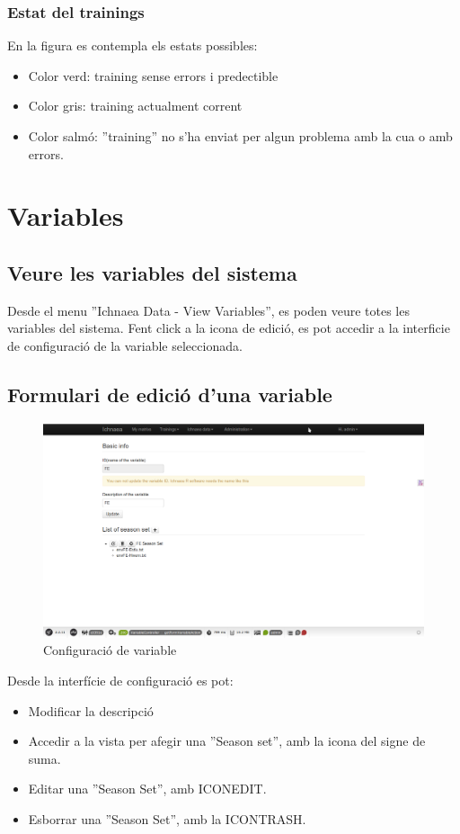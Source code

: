 \subsubsection*{Estat del trainings}
En la figura es contempla els estats possibles:
\begin{itemize}
\item Color verd: training sense errors i predectible
\item Color gris: training actualment corrent
\item Color salm\'{o}: ''training'' no s'ha enviat per algun problema amb la cua o amb errors.
\end{itemize}

\section{Variables}
\subsection{Veure les variables del sistema}
Desde el menu ''Ichnaea  Data - View Variables'', es poden veure totes les variables del sistema. Fent click a la icona de edici\'{o}, es pot accedir a la interficie de configuraci\'{o} de la variable seleccionada.

\subsection{Formulari de edici\'{o} d'una variable}
\begin{figure}[h!]
  \centering
  \includegraphics[scale=0.2]{img/userguide/variable_configuration.png}
  \caption{Configuraci\'{o} de variable}
  \label{fig:placement}
\end{figure}
Desde la interf\'{i}cie de configuraci\'{o} es pot:
\begin{itemize}
\item Modificar la descripci\'{o}
\item Accedir a la vista per afegir una ''Season set'', amb la icona del signe de suma.
\item Editar una ''Season Set'', amb ICONEDIT.
\item Esborrar una ''Season Set'', amb la ICONTRASH.
\end{itemize}

